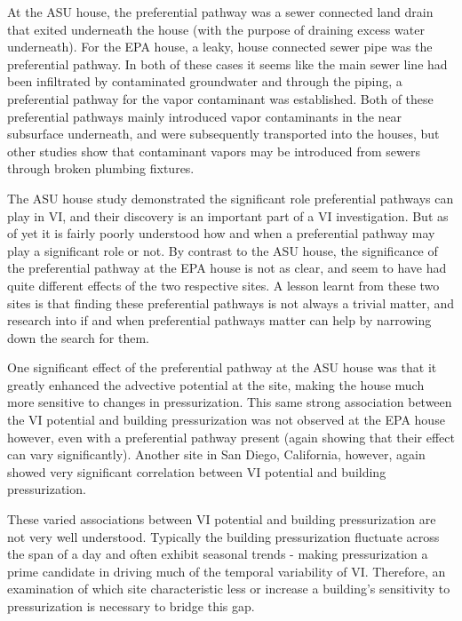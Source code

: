 At the ASU house, the preferential pathway was a sewer connected land drain that exited underneath the house (with the purpose of draining excess water underneath)\cite{guo_identification_2015}.
For the EPA house, a leaky, house connected sewer pipe was the preferential pathway\cite{mchugh_evidence_2017}.
In both of these cases it seems like the main sewer line had been infiltrated by contaminated groundwater and through the piping, a preferential pathway for the vapor contaminant was established.
Both of these preferential pathways mainly introduced vapor contaminants in the near subsurface underneath, and were subsequently transported into the houses, but other studies show that contaminant vapors may be introduced from sewers through broken plumbing fixtures\cite{pennell_sewer_2013,nielsen_remediation_2017}.

The ASU house study demonstrated the significant role preferential pathways can play in VI, and their discovery is an important part of a VI investigation.
But as of yet it is fairly poorly understood how and when a preferential pathway may play a significant role or not.
By contrast to the ASU house, the significance of the preferential pathway at the EPA house is not as clear, and seem to have had quite different effects of the two respective sites.
A lesson learnt from these two sites is that finding these preferential pathways is not always a trivial matter, and research into if and when preferential pathways matter can help by narrowing down the search for them.\par

One significant effect of the preferential pathway at the ASU house was that it greatly enhanced the advective potential at the site, making the house much more sensitive to changes in pressurization\cite{strom_factors_2019,guo_identification_2015,holton_temporal_2013}.
This same strong association between the VI potential and building pressurization was not observed at the EPA house however, even with a preferential pathway present (again showing that their effect can vary significantly).
Another site in San Diego, California, however, again showed very significant correlation between VI potential and building pressurization\cite{hosangadi_high-frequency_2017}.\par

These varied associations between VI potential and building pressurization are not very well understood.
Typically the building pressurization fluctuate across the span of a day and often exhibit seasonal trends - making pressurization a prime candidate in driving much of the temporal variability of VI.
Therefore, an examination of which site characteristic less or increase a building's sensitivity to pressurization is necessary to bridge this gap.\par

